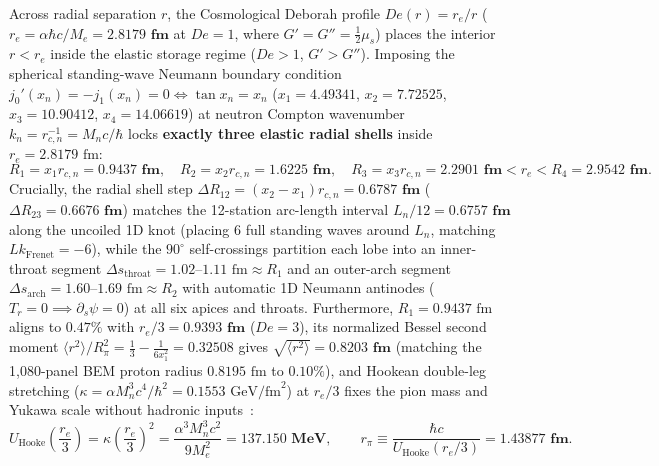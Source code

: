 \documentclass[11pt, a4paper]{article}
\begin{document}
Across radial separation $r$, the Cosmological Deborah profile $De(r) = r_e/r$ ($r_e = \alpha\hbar c/M_e = \mathbf{2.8179\text{ fm}}$ at $De = 1$, where $G' = G'' = \frac{1}{2}\mu_s$) places the interior $r < r_e$ inside the elastic storage regime ($De > 1$, $G' > G''$). Imposing the spherical standing-wave Neumann boundary condition $j_0'(x_n) = -j_1(x_n) = 0 \iff \tan x_n = x_n$ ($x_1 = 4.49341$, $x_2 = 7.72525$, $x_3 = 10.90412$, $x_4 = 14.06619$) at neutron Compton wavenumber $k_n = r_{c,n}^{-1} = M_n c/\hbar$ locks \textbf{exactly three elastic radial shells} inside $r_e = 2.8179\text{ fm}$:
\begin{equation}
    R_1 = x_1 r_{c,n} = \mathbf{0.9437\text{ fm}},\quad
    R_2 = x_2 r_{c,n} = \mathbf{1.6225\text{ fm}},\quad
    R_3 = x_3 r_{c,n} = \mathbf{2.2901\text{ fm}} < r_e < R_4 = \mathbf{2.9542\text{ fm}}.
    \label{eq:neumann_bessel_shells}
\end{equation}
Crucially, the radial shell step $\Delta R_{12} = (x_2 - x_1)r_{c,n} = \mathbf{0.6787\text{ fm}}$ ($\Delta R_{23} = \mathbf{0.6676\text{ fm}}$) matches the 12-station arc-length interval $L_n/12 = \mathbf{0.6757\text{ fm}}$ along the uncoiled 1D knot (placing 6 full standing waves around $L_n$, matching $Lk_{\mathrm{Frenet}} = -6$), while the $90^\circ$ self-crossings partition each lobe into an inner-throat segment $\Delta s_{\mathrm{throat}} = 1.02\text{--}1.11\text{ fm} \approx R_1$ and an outer-arch segment $\Delta s_{\mathrm{arch}} = 1.60\text{--}1.69\text{ fm} \approx R_2$ with automatic 1D Neumann antinodes ($T_r = 0 \implies \partial_s\psi = 0$) at all six apices and throats. Furthermore, $R_1 = 0.9437\text{ fm}$ aligns to $0.47\%$ with $r_e/3 = \mathbf{0.9393\text{ fm}}$ ($De = 3$), its normalized Bessel second moment $\langle r^2\rangle/R_\pi^2 = \frac{1}{3} - \frac{1}{6x_1^2} = 0.32508$ gives $\sqrt{\langle r^2\rangle} = \mathbf{0.8203\text{ fm}}$ (matching the 1,080-panel BEM proton radius $0.8195\text{ fm}$ to $0.10\%$), and Hookean double-leg stretching ($\kappa = \alpha M_n^3 c^4/\hbar^2 = 0.1553\text{ GeV/fm}^2$) at $r_e/3$ fixes the pion mass and Yukawa scale without hadronic inputs~\cite{bairmosheh2026}:
\begin{equation}
    U_{\mathrm{Hooke}}\!\left(\frac{r_e}{3}\right) = \kappa\left(\frac{r_e}{3}\right)^{\!2} = \frac{\alpha^3 M_n^3 c^2}{9 M_e^2} = \mathbf{137.150\text{ MeV}}, \qquad
    r_\pi \equiv \frac{\hbar c}{U_{\mathrm{Hooke}}(r_e/3)} = \mathbf{1.43877\text{ fm}}.
    \label{eq:hookean_pion_scale}
\end{equation}
\end{document}
